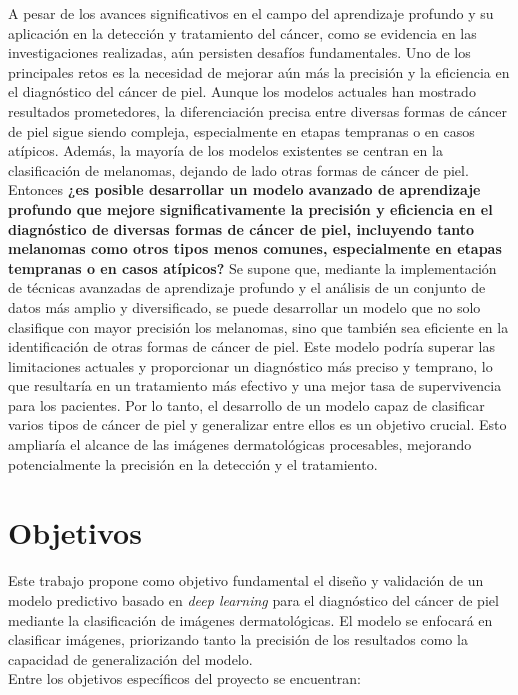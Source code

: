 A pesar de los avances significativos en el campo del aprendizaje profundo y su aplicación en la detección y tratamiento del cáncer, como se evidencia en las investigaciones realizadas, aún persisten desafíos fundamentales. Uno de los principales retos es la necesidad de mejorar aún más la precisión y la eficiencia en el diagnóstico del cáncer de piel. Aunque los modelos actuales han mostrado resultados prometedores, la diferenciación precisa entre diversas formas de cáncer de piel sigue siendo compleja, especialmente en etapas tempranas o en casos atípicos. Además, la mayoría de los modelos existentes se centran en la clasificación de melanomas, dejando de lado otras formas de cáncer de piel. Entonces \textbf{¿es posible desarrollar un modelo avanzado de aprendizaje profundo que mejore significativamente la precisión y eficiencia en el diagnóstico de diversas formas de cáncer de piel, incluyendo tanto melanomas como otros tipos menos comunes, especialmente en etapas tempranas o en casos atípicos?} Se supone que, mediante la implementación de técnicas avanzadas de aprendizaje profundo y el análisis de un conjunto de datos más amplio y diversificado, se puede desarrollar un modelo que no solo clasifique con mayor precisión los melanomas, sino que también sea eficiente en la identificación de otras formas de cáncer de piel. Este modelo podría superar las limitaciones actuales y proporcionar un diagnóstico más preciso y temprano, lo que resultaría en un tratamiento más efectivo y una mejor tasa de supervivencia para los pacientes. Por lo tanto, el desarrollo de un modelo capaz de clasificar varios tipos de cáncer de piel y generalizar entre ellos es un objetivo crucial. Esto ampliaría el alcance de las imágenes dermatológicas procesables, mejorando potencialmente la precisión en la detección y el tratamiento.

\section*{Objetivos}

Este trabajo propone como objetivo fundamental el diseño y validación de un modelo predictivo basado en \textit{deep learning} para el diagnóstico del cáncer de piel mediante la clasificación de imágenes dermatológicas. El modelo se enfocará en clasificar imágenes, priorizando tanto la precisión de los resultados como la capacidad de generalización del modelo. \\


Entre los objetivos específicos del proyecto se encuentran:

